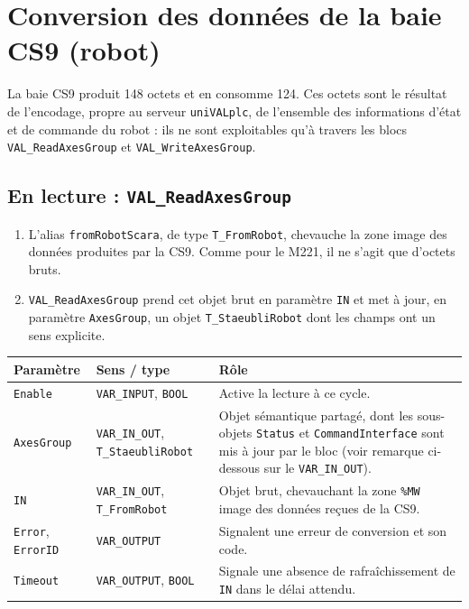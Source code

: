 \section{Conversion des données de la baie CS9 (robot)}
\label{secConversionRobot}

La baie CS9 produit 148 octets et en consomme 124. Ces octets sont le résultat de
l'encodage, propre au serveur \texttt{uniVALplc}, de l'ensemble des
informations d'état et de commande du robot : ils ne sont exploitables
qu'à travers les blocs \texttt{VAL\_ReadAxesGroup} et
\texttt{VAL\_WriteAxesGroup}.

\subsection{En lecture : \texttt{VAL\_ReadAxesGroup}}

\begin{enumerate}
    \item L'alias \texttt{fromRobotScara}, de type \texttt{T\_FromRobot},
    chevauche la zone image des données produites par la CS9. Comme pour
    le M221, il ne s'agit que d'octets bruts.
    \item \texttt{VAL\_ReadAxesGroup} prend cet objet brut en paramètre
    \texttt{IN} et met à jour, en paramètre \texttt{AxesGroup}, un objet
    \texttt{T\_StaeubliRobot} dont les champs ont un sens explicite.
\end{enumerate}

\begin{center}
\begin{tabular}{|l|l|p{7cm}|}
\hline
\textbf{Paramètre} & \textbf{Sens / type} & \textbf{Rôle} \\
\hline
\texttt{Enable} & \texttt{VAR\_INPUT}, \texttt{BOOL} & Active la lecture
à ce cycle. \\
\hline
\texttt{AxesGroup} & \texttt{VAR\_IN\_OUT}, \texttt{T\_StaeubliRobot} &
Objet sémantique partagé, dont les sous-objets \texttt{Status} et
\texttt{CommandInterface} sont mis à jour par le bloc (voir remarque ci-dessous sur le \texttt{VAR\_IN\_OUT}). \\
\hline
\texttt{IN} & \texttt{VAR\_IN\_OUT}, \texttt{T\_FromRobot} & Objet brut,
chevauchant la zone \texttt{\%MW} image des données reçues de la CS9. \\
\hline
\texttt{Error}, \texttt{ErrorID} & \texttt{VAR\_OUTPUT} & Signalent une
erreur de conversion et son code. \\
\hline
\texttt{Timeout} & \texttt{VAR\_OUTPUT}, \texttt{BOOL} & Signale une
absence de rafraîchissement de \texttt{IN} dans le délai attendu. \\
\hline
\end{tabular}
\end{center}

